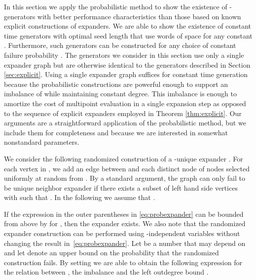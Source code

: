 \documentclass[a4paper,11pt]{article}
\theoremstyle{plain}
\theoremstyle{definition}
\begin{document}
In this section we apply the probabilistic method to show the existence of -generators with better performance characteristics than those based on known explicit constructions of expanders. 
We are able to show the existence of constant time generators with optimal seed length that use  words of space for any constant . 
Furthermore, such generators can be constructed for any choice of constant failure probability . 
The generators we consider in this section use only a single expander graph but are otherwise identical to the generators described in Section \ref{sec:explicit}.
Using a single expander graph suffices for constant time generation because the probabilistic constructions are powerful enough to support an imbalance of  while maintaining constant degree.
This imbalance is enough to amortize the cost of multipoint evaluation in a single expansion step as opposed to the sequence of explicit expanders employed in Theorem \ref{thm:explicit}. 
Our arguments are a straightforward application of the probabilistic method, but we include them for completeness and because we are interested in somewhat nonstandard parameters.

We consider the following randomized construction of a -unique expander . 
For each vertex  in , we add an edge between  and each distinct node of  nodes selected uniformly at random from .  
By a standard argument, the graph can only fail to be unique neighbor expander if there exists a subset  of left hand side vertices with  such that  \cite[Lemma 2.8]{siegel2004}.
In the following we assume that . 

If the expression in the outer parentheses in \eqref{eq:probexpander} can be bounded from above by  for , then the expander exists.
We also note that the randomized expander construction can be performed using -independent variables without changing the result in~\eqref{eq:probexpander}. 
Let  be a number that may depend on  and let  denote an upper bound on the probability that the randomized construction fails. 
By setting  we are able to obtain the following expression for the relation between , the imbalance  and the left outdegree bound .
\end{document}
